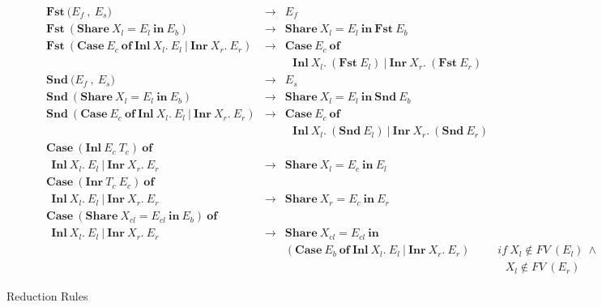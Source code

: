 \documentclass[11p,a4paper]{article}
\newcommand{\expshr}[3]{\mathbf{Share}\ #1\boldsymbol{=}#2\ \mathbf{in}\ #3}
\newcommand{\expprd}[2]{\boldsymbol{(}#1\ \boldsymbol{,}\ #2\boldsymbol{)}}
\newcommand{\expfst}[1]{\mathbf{Fst}\ #1}
\newcommand{\expsnd}[1]{\mathbf{Snd}\ #1}
\newcommand{\explft}[2]{\mathbf{Inl}\ #1\ #2}
\newcommand{\exprgt}[2]{\mathbf{Inr}\ #1\ #2}
\newcommand{\expcas}[5]{\mathbf{Case}\ #1\ \mathbf{of}\ \mathbf{Inl}\ #2.\ #3\ \boldsymbol{|}\ \mathbf{Inr}\ #4.\ #5}
\newcommand{\fv}[1]{FV\ (#1)}
\newcommand{\valuep}[1]{Value\ (#1)}
\begin{document}
\begin{figure*}[h]
\[\begin{array}{lcll}
\expfst{\expprd{E_f}{E_s}}                         & \longrightarrow 
& E_f                                              & \\

\expfst{(\expshr{X_l}{E_l}{E_b})}                   & \longrightarrow 
& \expshr{X_l}{E_l}{\expfst E_b}                    & \\

\expfst{(\expcas{E_c}{X_l}{E_l}{X_r}{E_r})}          & \longrightarrow 
& \mathbf{Case}\ E_c\ \mathbf{of}\\& & \ \ \ \mathbf{Inl}\ X_l.\ (\expfst{E_l})\ \boldsymbol{|}\ \mathbf{Inr}\ X_r.\ (\expfst{E_r}) 
& \\

\expsnd{\expprd{E_f}{E_s}}                          & \longrightarrow 
& E_s                                               & \\

\expsnd{(\expshr{X_l}{E_l}{E_b})}                    & \longrightarrow 
& \expshr{X_l}{E_l}{\expsnd E_b}                     & \\

\expsnd{(\expcas{E_c}{X_l}{E_l}{X_r}{E_r})}          & \longrightarrow 
& \mathbf{Case}\ E_c\ \mathbf{of}\\& & \ \ \ \mathbf{Inl}\ X_l.\ (\expsnd{E_l})\ \boldsymbol{|}\ \mathbf{Inr}\ X_r.\ (\expsnd{E_r}) 
& \\

 
\mathbf{Case}\ (\explft{E_c}{T_c})\ \mathbf{of}\\\ \  \mathbf{Inl}\ X_l.\ E_l\ \boldsymbol{|}\ \mathbf{Inr}\ X_r.\ E_r 
& \longrightarrow 
& \expshr{X_l}{E_c}{E_l}                             & \\
 
\mathbf{Case}\ (\exprgt{T_c}{E_c})\ \mathbf{of}\\\ \  \mathbf{Inl}\ X_l.\ E_l\ \boldsymbol{|}\ \mathbf{Inr}\ X_r.\ E_r 
& \longrightarrow 
& \expshr{X_r}{E_c}{E_r}                             & \\

\mathbf{Case}\ (\expshr{X_{cl}}{E_{cl}}{E_b})\ \mathbf{of}\\\ \  \mathbf{Inl}\ X_l.\ E_l\ \boldsymbol{|}\ \mathbf{Inr}\ X_r.\ E_r 
& \longrightarrow 
& \expshr{X_{cl}}{E_{cl}}{\\&&(\expcas{E_b}{X_l}{E_l}{X_r}{E_r})}       & if\ X_l \notin \fv{E_l}\ \wedge \\ & & &\ \ \ X_l \notin \fv{E_r} 
 

\end{array}
\]
\caption{Reduction Rules}
\label{fig:red}
\end{figure*} 
\end{document}
